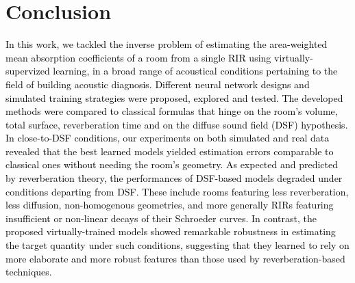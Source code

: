 \documentclass[reprint]{JASA}
\begin{document}
\section{\label{sec:conclusion} Conclusion}
\textcolor{black}{In this work, we tackled the inverse problem of estimating the area-weighted mean absorption coefficients of a room from a single RIR using virtually-supervized learning, in a broad range of acoustical conditions pertaining to the field of building acoustic diagnosis. Different neural network designs and simulated training strategies were proposed, explored and tested. The developed methods were compared to classical formulas that hinge on the room's volume, total surface, reverberation time and on the diffuse sound field (DSF) hypothesis. In close-to-DSF conditions, our experiments on both simulated and real data revealed that the best learned models yielded estimation errors comparable to classical ones without needing the room's geometry. As expected and predicted by reverberation theory, the performances of DSF-based models degraded under conditions departing from DSF. These include rooms featuring less reverberation, less diffusion, non-homogenous geometries, and more generally RIRs featuring insufficient or non-linear decays of their Schroeder curves. In contrast, the proposed virtually-trained models showed remarkable robustness in estimating the target quantity under such conditions, suggesting that they learned to rely on more elaborate and more robust features than those used by reverberation-based techniques.}

\end{document}
